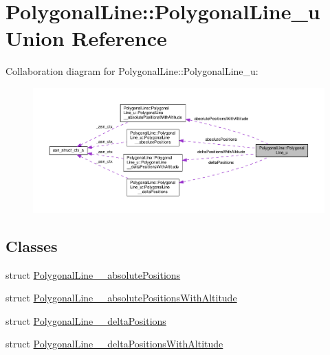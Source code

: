 \hypertarget{unionPolygonalLine_1_1PolygonalLine__u}{}\section{Polygonal\+Line\+:\+:Polygonal\+Line\+\_\+u Union Reference}
\label{unionPolygonalLine_1_1PolygonalLine__u}


Collaboration diagram for Polygonal\+Line\+:\+:Polygonal\+Line\+\_\+u\+:\nopagebreak
\begin{figure}[H]
\begin{center}
\leavevmode
\includegraphics[width=350pt]{unionPolygonalLine_1_1PolygonalLine__u__coll__graph}
\end{center}
\end{figure}
\subsection*{Classes}
\begin{DoxyCompactItemize}
\item 
struct \hyperlink{structPolygonalLine_1_1PolygonalLine__u_1_1PolygonalLine____absolutePositions}{Polygonal\+Line\+\_\+\+\_\+absolute\+Positions}
\item 
struct \hyperlink{structPolygonalLine_1_1PolygonalLine__u_1_1PolygonalLine____absolutePositionsWithAltitude}{Polygonal\+Line\+\_\+\+\_\+absolute\+Positions\+With\+Altitude}
\item 
struct \hyperlink{structPolygonalLine_1_1PolygonalLine__u_1_1PolygonalLine____deltaPositions}{Polygonal\+Line\+\_\+\+\_\+delta\+Positions}
\item 
struct \hyperlink{structPolygonalLine_1_1PolygonalLine__u_1_1PolygonalLine____deltaPositionsWithAltitude}{Polygonal\+Line\+\_\+\+\_\+delta\+Positions\+With\+Altitude}
\end{DoxyCompactItemize}
